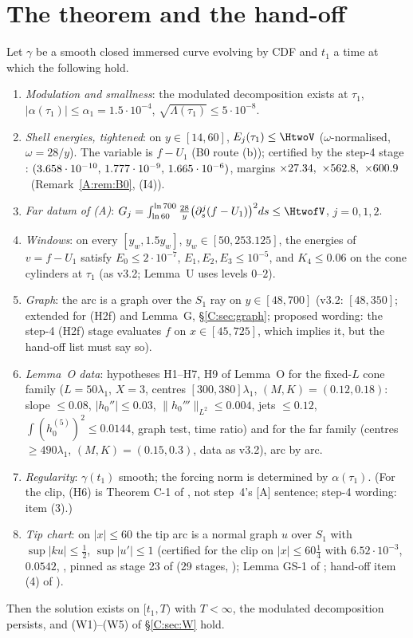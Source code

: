 \documentclass[11pt]{article}
\begin{document}
\section{The theorem and the hand-off}\label{M:sec:thm}
\begin{theorem}\label{M:thm:W}
Let $\gamma$ be a smooth closed immersed curve evolving by CDF and $t_1$ a time at which the following hold.
\begin{enumerate}[label=\textup{(H\arabic*)},leftmargin=*]
\item \emph{Modulation and smallness}: the modulated decomposition exists at $\tau_1$, $|\alpha(\tau_1)|\le\alpha_1=1.5\cdot10^{-4}$, $\sqrt{\Lambda(\tau_1)}\le5\cdot10^{-8}$.
\item \emph{Shell energies, tightened}: on $y\in[14,60]$, $E_j(\tau_1)\le\HtwoV$ ($\omega$-normalised, $\omega=28/y$).
The variable is $f-U_1$ (B0 route (b)); certified by the step-4 stage : $(3.658\cdot10^{-10},\,1.777\cdot10^{-9},\,1.665\cdot10^{-6})$, margins $\times27.34,\ \times562.8,\ \times600.9$ \tC\ (Remark~\ref{A:rem:B0}, (I4)).
\item[\textup{(H2f)}] \emph{Far datum of (A)}: $G_j=\int_{\ln60}^{\ln700}\frac{28}y\bigl(\partial_s^j(f-U_1)\bigr)^2ds\le\HtwofV$, $j=0,1,2$.
\item[\textup{(H3)}] \emph{Windows}: on every $[y_w,1.5y_w]$, $y_w\in[50,253.125]$, the energies of $v=f-U_1$ satisfy $E_0\le2\cdot10^{-7}$, $E_1,E_2,E_3\le10^{-5}$, and $K_4\le0.06$ on the cone cylinders at $\tau_1$ (as v3.2; Lemma~U uses levels $0$--$2$).
\item[\textup{(H4)}] \emph{Graph}: the arc is a graph over the $S_1$ ray on $y\in[48,700]$ (v3.2: $[48,350]$; extended for (H2f) and Lemma~G, \S\ref{C:sec:graph}; proposed wording: the step-4 (H2f) stage evaluates $f$ on $x\in[45,725]$, which implies it, but the hand-off list must say so).
\item[\textup{(H5)}] \emph{Lemma~O data}: hypotheses H1--H7, H9 of Lemma~O for the fixed-$L$ cone family ($L=50\lambda_1$, $X=3$, centres $[300,380]\lambda_1$, $(M,K)=(0.12,0.18)$: slope $\le0.08$, $|h_0''|\le0.03$, $\|h_0'''\|_{L^2}\le0.004$, jets $\le0.12$, $\int(h_0^{(5)})^2\le0.0144$, graph test, time ratio) and for the far family (centres $\ge490\lambda_1$, $(M,K)=(0.15,0.3)$, data as v3.2), arc by arc.
\item[\textup{(H6)}] \emph{Regularity}: $\gamma(t_1)$ smooth; the forcing norm is determined by $\alpha(\tau_1)$. (For the clip, (H6) is Theorem C-1 of , not step~4's [A] sentence; step-4 wording:  item (3).)
\item[\textup{(GS)}] \emph{Tip chart}: on $|x|\le60$ the tip arc is a normal graph $u$ over $S_1$ with $\sup|ku|\le\frac12$, $\sup|u'|\le1$ (certified for the clip on $|x|\le60\frac14$ with $6.52\cdot10^{-3}$, $0.0542$, , pinned as stage 23 of  (29 stages, ); Lemma GS-1 of ; hand-off item (4) of ).
\end{enumerate}
Then the solution exists on $[t_1,T)$ with $T<\infty$, the modulated decomposition persists, and (W1)--(W5) of \S\ref{C:sec:W} hold.
\end{theorem}
\end{document}
